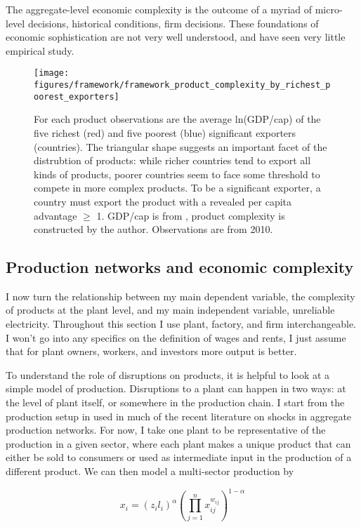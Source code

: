 \documentclass[11pt]{article}
\begin{document}
The aggregate-level economic complexity is the outcome of a myriad of micro-level decisions, historical conditions, firm decisions. These foundations of economic sophistication are not very well understood, and have seen very little empirical study.

\begin{figure}[htpb]
	\centering
	\texttt{[image: figures/framework/framework\_product\_complexity\_by\_richest\_poorest\_exporters]}
	\caption{For each product observations are the average ln(GDP/cap) of the five richest (red) and five poorest (blue) significant exporters (countries). The triangular shape suggests an important facet of the distrubtion of products: while richer countries tend to export all kinds of products, poorer countries seem to face some threshold to compete in more complex products. To be a significant exporter, a country must export the product with a revealed per capita advantage \(\geq\) 1. GDP/cap is from \cite{world_bank_world_2020-1}, product complexity is constructed by the author. Observations are from 2010.}%
	\label{fig:framework-least-most}
\end{figure}

\subsection{Production networks and economic complexity}
\label{sec:production_networks}
I now turn the relationship between my main dependent variable, the complexity of products at the plant level, and my main independent variable, unreliable electricity. Throughout this section I use plant, factory, and firm interchangeable. I won't go into any specifics on the definition of wages and rents, I just assume that for plant owners, workers, and investors more output is better.

To understand the role of disruptions on products, it is helpful to look at a simple model of production. Disruptions to a plant can happen in two ways: at the level of plant itself, or somewhere in the production chain. I start from the production setup in \cite{acemoglu_network_2012} used in much of the recent literature on shocks in aggregate production networks. For now, I take one plant to be representative of the production in a given sector, where each plant makes a unique product that can either be sold to consumers or used as intermediate input in the production of a different product. We can then model a multi-sector production by

\[
x_i =  (z_i l_i)^{\alpha}(\prod^{n}_{j = 1} x_{ij}^{w_{ij}})^{1 - \alpha}
\]
\end{document}
